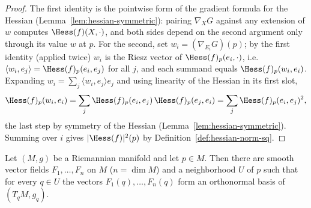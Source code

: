 \begin{proof}
\leanok
The first identity is the pointwise form of the gradient formula for
the Hessian (Lemma~\ref{lem:hessian-symmetric}): pairing
$\nabla_XG$ against any extension of $w$ computes
$\Hess(f)(X,\cdot)$, and both sides depend on the second argument
only through its value $w$ at $p$. For the second, set
$w_i=\left(\nabla_{E_i}G\right)(p)$; by the first identity (applied
twice) $w_i$ is the Riesz vector of $\Hess(f)_p(e_i,\cdot)$, i.e.
$\langle w_i,e_j\rangle=\Hess(f)_p(e_i,e_j)$ for all $j$, and each
summand equals $\Hess(f)_p(w_i,e_i)$. Expanding
$w_i=\sum_j\langle w_i,e_j\rangle e_j$ and using linearity of the
Hessian in its first slot,
$$\Hess(f)_p(w_i,e_i)
=\sum_j\Hess(f)_p(e_i,e_j)\,\Hess(f)_p(e_j,e_i)
=\sum_j\Hess(f)_p(e_i,e_j)^2,$$
the last step by symmetry of the Hessian
(Lemma~\ref{lem:hessian-symmetric}). Summing over $i$ gives
$|\Hess(f)|^2(p)$ by Definition~\ref{def:hessian-norm-sq}.
\end{proof}

\begin{lemma}
\label{lem:local-orthonormal-frame}
\leanok
Let $(M,g)$ be a Riemannian manifold and let $p\in M$. Then there are
smooth vector fields $F_1,\ldots,F_n$ on $M$ ($n=\dim M$) and a
neighborhood $U$ of $p$ such that for every $q\in U$ the vectors
$F_1(q),\ldots,F_n(q)$ form an orthonormal basis of $(T_qM,g_q)$.
\end{lemma}

